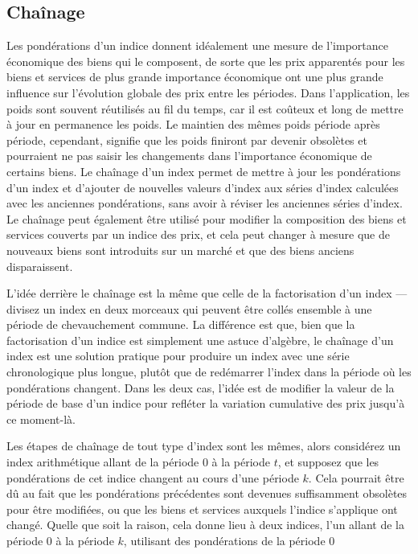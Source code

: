 \documentclass[
]{article}
\begin{document}
\hypertarget{chauxeenage}{%
\subsection{Chaînage}\label{chauxeenage}}

Les pondérations d'un indice donnent idéalement une mesure de l'importance économique des biens qui le composent, de sorte que les prix apparentés pour les biens et services de plus grande importance économique ont une plus grande influence sur l'évolution globale des prix entre les périodes. Dans l'application, les poids sont souvent réutilisés au fil du temps, car il est coûteux et long de mettre à jour en permanence les poids. Le maintien des mêmes poids période après période, cependant, signifie que les poids finiront par devenir obsolètes et pourraient ne pas saisir les changements dans l'importance économique de certains biens. Le chaînage d'un index permet de mettre à jour les pondérations d'un index et d'ajouter de nouvelles valeurs d'index aux séries d'index calculées avec les anciennes pondérations, sans avoir à réviser les anciennes séries d'index. Le chaînage peut également être utilisé pour modifier la composition des biens et services couverts par un indice des prix, et cela peut changer à mesure que de nouveaux biens sont introduits sur un marché et que des biens anciens disparaissent.

L'idée derrière le chaînage est la même que celle de la factorisation d'un index --- divisez un index en deux morceaux qui peuvent être collés ensemble à une période de chevauchement commune. La différence est que, bien que la factorisation d'un indice est simplement une astuce d'algèbre, le chaînage d'un index est une solution pratique pour produire un index avec une série chronologique plus longue, plutôt que de redémarrer l'index dans la période où les pondérations changent. Dans les deux cas, l'idée est de modifier la valeur de la période de base d'un indice pour refléter la variation cumulative des prix jusqu'à ce moment-là.

Les étapes de chaînage de tout type d'index sont les mêmes, alors considérez un index arithmétique allant de la période 0 à la période \(t\), et supposez que les pondérations de cet indice changent au cours d'une période \(k\). Cela pourrait être dû au fait que les pondérations précédentes sont devenues suffisamment obsolètes pour être modifiées, ou que les biens et services auxquels l'indice s'applique ont changé. Quelle que soit la raison, cela donne lieu à deux indices, l'un allant de la période 0 à la période \(k\), utilisant des pondérations de la période 0
\end{document}
